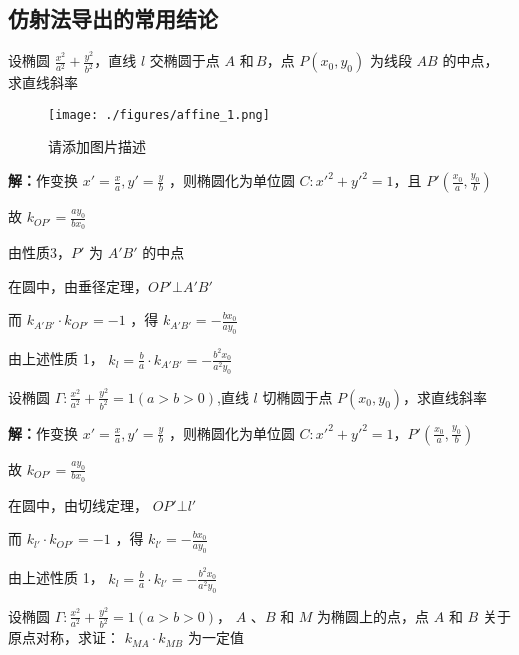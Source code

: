 \begin{corollary}{}
\subsection{仿射法导出的常用结论}
\begin{corollary}{}
设椭圆 $\displaystyle{\frac{x^2}{a^2}+\frac{y^2}{b^2}}$，直线 $\displaystyle{l}$ 交椭圆于点 $\displaystyle{A}$ 和\,$\displaystyle{B}$，点 $\displaystyle{P(x_0,y_0)}$ 为线段 $\displaystyle{AB}$ 的中点，求直线斜率
\begin{figure}[ht]
\centering
\texttt{[image: ./figures/affine\_1.png]}
\caption{请添加图片描述} \label{affine_fig1}
\end{figure}

\textbf{解：}作变换 $\displaystyle{x'=\frac{x}{a},y'=\frac{y}{b}}$ ，则椭圆化为单位圆 $\displaystyle{C:x'^2+y'^2=1}$，且 $\displaystyle{P'\left(\frac{x_0}{a},\frac{y_0}{b}\right)}$

故 $\displaystyle{k_{OP'}=\frac{ay_0}{bx_0}}$

由性质3，$\displaystyle{P'}$ 为 $\displaystyle{A'B'}$ 的中点

在圆中，由垂径定理，$\displaystyle{OP'\bot A'B'}$

而 $\displaystyle{k_{A'B'}\cdot k_{OP'}=-1}$ ，得 $\displaystyle{k_{A'B'}=-\frac{bx_0}{ay_0}}$

由上述性质 1， $\displaystyle{k_l=\frac{b}{a}\cdot k_{A'B'}=-\frac{b^2x_0}{a^2y_0}}$
\end{corollary}
\begin{corollary}{}
设椭圆   $\displaystyle{\Gamma:\frac{x^2}{a^2}+\frac{y^2}{b^2}=1(a>b>0)}$,直线 $\displaystyle{l}$ 切椭圆于点 $\displaystyle{P(x_0,y_0)}$，求直线斜率 

\textbf{解：}作变换 $\displaystyle{x'=\frac{x}{a},y'=\frac{y}{b}}$ ，则椭圆化为单位圆 $\displaystyle{C:x'^2+y'^2=1}$，$\displaystyle{P'\left(\frac{x_0}{a},\frac{y_0}{b}\right)}$ 

故  $\displaystyle{k_{OP'}=\frac{ay_0}{bx_0}}$ 

在圆中，由切线定理， $\displaystyle{OP'\bot l'}$ 

而  $\displaystyle{k_{l'}\cdot k_{OP'}=-1}$ ，得 $\displaystyle{k_{l'}=-\frac{bx_0}{ay_0}}$ 

由上述性质 1， $\displaystyle{k_l=\frac{b}{a}\cdot k_{l'}=-\frac{b^2x_0}{a^2y_0}}$ 

\end{corollary}

\begin{corollary}{}
设椭圆 $\displaystyle{\Gamma:\frac{x^2}{a^2}+\frac{y^2}{b^2}=1(a>b>0)}$， $\displaystyle{A}$ 、$\displaystyle{B}$ 和 $\displaystyle{M}$ 为椭圆上的点，点 $\displaystyle{A}$ 和 $\displaystyle{B}$ 关于原点对称，求证： $\displaystyle{k_{MA}\cdot k_{MB}}$ 为一定值


\end{corollary}
\end{corollary}
